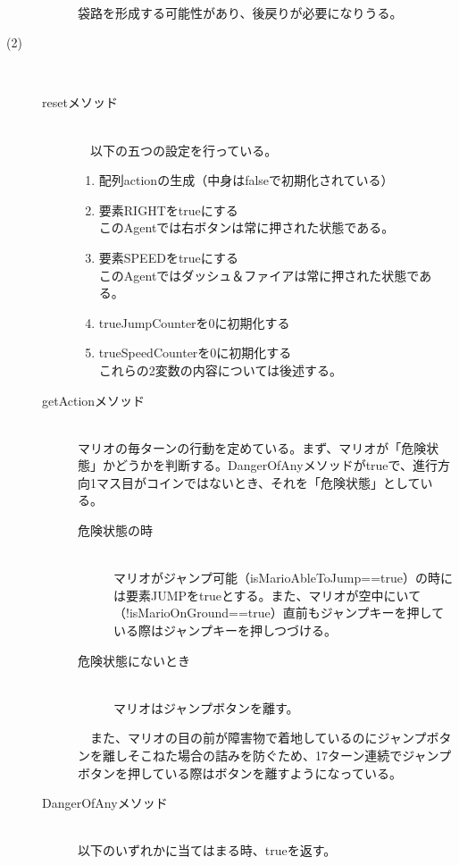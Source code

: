 \documentclass[a4j]{jarticle}
\begin{document}
\begin{description}
\begin{description}
	\\
	袋路を形成する可能性があり、後戻りが必要になりうる。
	\end{description}
\item[(2)]
　\begin{description}
  \item[resetメソッド]~\\
  　以下の五つの設定を行っている。
   \begin{enumerate}
   \item 配列actionの生成（中身はfalseで初期化されている）
   \item 要素RIGHTをtrueにする ~\\
     このAgentでは右ボタンは常に押された状態である。
　 \item 要素SPEEDをtrueにする　~\\
     このAgentではダッシュ＆ファイアは常に押された状態である。
　 \item trueJumpCounterを0に初期化する
   \item trueSpeedCounterを0に初期化する~\\
     これらの2変数の内容については後述する。
   \end{enumerate}
  \item[getActionメソッド]~\\
    マリオの毎ターンの行動を定めている。まず、マリオが「危険状態」かどうかを判断する。DangerOfAnyメソッドがtrueで、進行方向1マス目がコインではないとき、それを「危険状態」としている。
    \begin{description}
    \item[危険状態の時]~\\
      マリオがジャンプ可能（isMarioAbleToJump==true）の時には要素JUMPをtrueとする。また、マリオが空中にいて（!isMarioOnGround==true）直前もジャンプキーを押している際はジャンプキーを押しつづける。
    \item[危険状態にないとき]~\\
      マリオはジャンプボタンを離す。
　  \end{description}
    　また、マリオの目の前が障害物で着地しているのにジャンプボタンを離しそこねた場合の詰みを防ぐため、17ターン連続でジャンプボタンを押している際はボタンを離すようになっている。
　\item[DangerOfAnyメソッド]~\\
以下のいずれかに当てはまる時、trueを返す。
\end{description}
\end{description}
\end{document}
